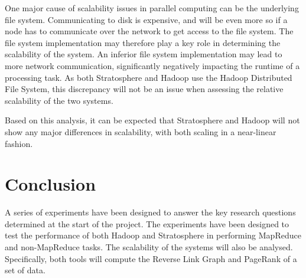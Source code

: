 One major cause of scalability issues in parallel computing can be the underlying file system. Communicating to disk is expensive, and will be even more so if a node has to communicate over the network to get access to the file system. The file system implementation may therefore play a key role in determining the scalability of the system. An inferior file system implementation may lead to more network communication, significantly negatively impacting the runtime of a processing task. As both Stratosphere and Hadoop use the Hadoop Distributed File System, this discrepancy will not be an issue when assessing the relative scalability of the two systems.

Based on this analysis, it can be expected that Stratosphere and Hadoop will not show any major differences in scalability, with both scaling in a near-linear fashion.

\section{Conclusion}
A series of experiments have been designed to answer the key research questions determined at the start of the project. The experiments have been designed to test the performance of both Hadoop and Stratosphere in performing MapReduce and non-MapReduce tasks. The scalability of the systems will also be analysed. Specifically, both tools will compute the Reverse Link Graph and PageRank of a set of data. 